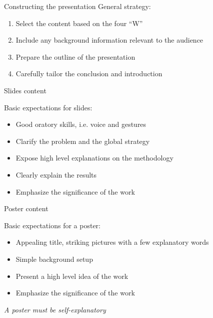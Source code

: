 \begin{frame}{Constructing the presentation}
	General strategy:
	\begin{enumerate}\bigsep 
	\item Select the content based on the four ``W''
	\item Include any background information relevant to the audience
	\item Prepare the outline of the presentation
	\item Carefully tailor the conclusion and introduction
\end{enumerate}

\end{frame}


\begin{frame}{Slides content}
	
	\bigskip

	\raggedright 
 
	Basic expectations for slides:
	\begin{itemize}\bigsep 
		\item Good oratory skills, i.e. voice and gestures
		\item Clarify the problem and the global strategy
		\item Expose high level explanations on the methodology
		\item Clearly explain the results 
		\item Emphasize the significance of the work
	\end{itemize}

\end{frame}


\begin{frame}{Poster content}

	\bigskip

	\raggedright 

	Basic expectations for a poster:
	\begin{itemize}\bigsep
		\item Appealing title, striking pictures with a few explanatory words 
		\item Simple background setup 
		\item Present a high level idea of the work 
		\item Emphasize the significance of the work
	\end{itemize}
	\pause\medskip

	\center \em 
	A poster must be self-explanatory

\end{frame}

